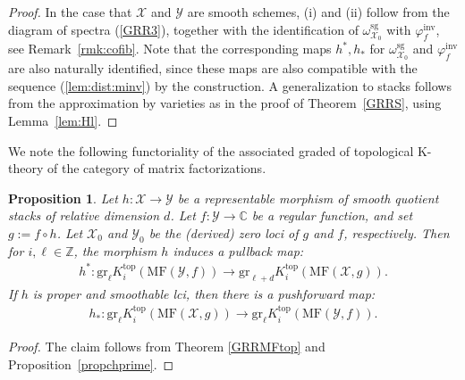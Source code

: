\documentclass [11pt,oneside,a4paper,mathscr]{amsart}
\newtheorem{prop}[thm]{Proposition}
\theoremstyle{definition}
\newcommand{\X}{\mathscr{X}}
\begin{document}
\begin{proof}
In the case that $\X$ and $\mathscr{Y}$ are smooth schemes, 
(i) and (ii) follow from the diagram of spectra (\ref{GRR3}), together with the identification of $\omega_{\X_0}^{\mathrm{sg}}$ with $\varphi_f^{\mathrm{inv}}$, see Remark~\ref{rmk:cofib}. 
Note that the corresponding maps $h^*, h_{*}$ for $\omega_{\X_0}^{\mathrm{sg}}$ and $\varphi_f^{\mathrm{inv}}$ are also 
naturally identified, since these maps are also compatible with the 
sequence (\ref{lem:dist:minv}) by the construction. 
A generalization to stacks follows from the approximation by varieties
  as in the proof of Theorem~\ref{GRRS}, using Lemma~\ref{lem:Hl}. 
\end{proof}








We note the following functoriality of 
the associated graded of 
topological K-theory of the category of matrix factorizations.

\begin{prop}\label{functoriality:Ktop}
Let $h\colon \X\to \mathscr{Y}$ be a representable morphism of smooth quotient stacks of relative dimension $d$. Let $f\colon \mathscr{Y}\to \mathbb{C}$ be a regular function, and set $g:=f\circ h$. 
Let $\X_0$ and $\mathscr{Y}_0$ be the (derived) zero loci of $g$ and $f$, respectively. 
Then for $i, \ell\in\mathbb{Z}$, 
the morphism $h$ induces a pullback map:
\begin{align*}
    h^*\colon \mathrm{gr}_\ell K^{\mathrm{top}}_i(\mathrm{MF}(\mathscr{Y}, f))\to \mathrm{gr}_{\ell+d} K^{\mathrm{top}}_i(\mathrm{MF}(\X, g)).
\end{align*}
If $h$ is proper and smoothable lci, then there is a pushforward map:
\begin{align*}
    h_*\colon \mathrm{gr}_\ell K^{\mathrm{top}}_i(\mathrm{MF}(\X, g))\to \mathrm{gr}_\ell K^{\mathrm{top}}_i(\mathrm{MF}(\mathscr{Y}, f)).
\end{align*}
\end{prop}

\begin{proof}
The claim follows from Theorem \ref{GRRMFtop}
and Proposition~\ref{propchprime}. 
\end{proof}
\end{document}
